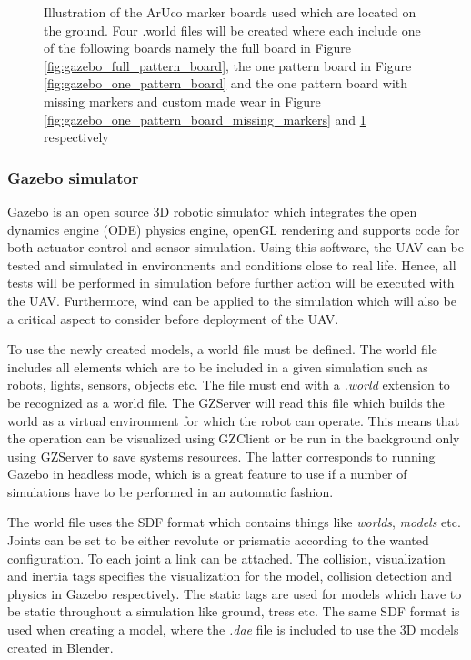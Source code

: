 \documentclass[../Head/report.tex]{subfiles}
\begin{document}
\begin{figure}[H]
\begin{subfigure}[t]{.20\textwidth}
        \caption{}
        \label{fig:gazebo_one_pattern_board_missing_markers_wear}
    \end{subfigure}
    \caption{Illustration of the ArUco marker boards used which are located on the ground. Four .world files will be created where each include one of the following boards namely the full board in Figure \ref{fig:gazebo_full_pattern_board}, the one pattern board in Figure \ref{fig:gazebo_one_pattern_board} and the one pattern board with missing markers and custom made wear in Figure \ref{fig:gazebo_one_pattern_board_missing_markers} and \ref{fig:gazebo_one_pattern_board_missing_markers_wear} respectively}  
    \label{fig:gazebo_full_and_one_patterns_boards}
\end{figure}

\subsubsection{Gazebo simulator}
\label{sec:gazebo}

Gazebo is an open source 3D robotic simulator which integrates the open dynamics engine (ODE) physics engine, openGL rendering and supports code for both actuator control and sensor simulation. Using this software, the UAV can be tested and simulated in environments and conditions close to real life. Hence, all tests will be performed in simulation before further action will be executed with the UAV. Furthermore, wind can be applied to the simulation which will also be a critical aspect to consider before deployment of the UAV. 

To use the newly created models, a world file must be defined. The world file includes all elements which are to be included in a given simulation such as robots, lights, sensors, objects etc. The file must end with a \textit{.world} extension to be recognized as a world file. The GZServer will read this file which builds the world as a virtual environment for which the robot can operate. This means that the operation can be visualized using GZClient or be run in the background only using GZServer to save systems resources. The latter corresponds to running Gazebo in headless mode, which is a great feature to use if a number of simulations have to be performed in an automatic fashion.

The world file uses the SDF format which contains things like \textit{worlds}, \textit{models} etc. Joints can be set to be either revolute or prismatic according to the wanted configuration. To each joint a link can be attached. The collision, visualization and inertia tags specifies the visualization for the model, collision detection and physics in Gazebo respectively. The static tags are used for models which have to be static throughout a simulation like ground, tress etc. The same SDF format is used when creating a model, where the \textit{.dae} file is included to use the 3D models created in Blender.  
\end{document}
